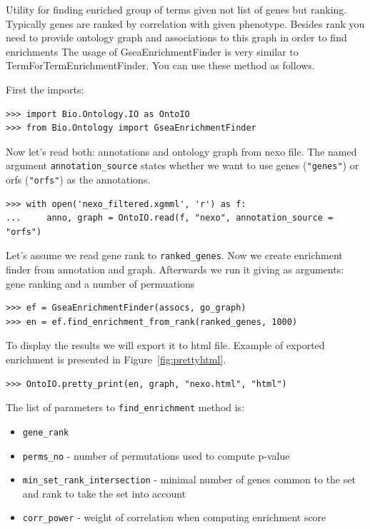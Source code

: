 \documentclass{report}
\begin{document}
Utility for finding enriched group of terms given not list of genes
but ranking. Typically genes are ranked by correlation with given
phenotype. Besides rank you need to provide ontology graph and
associations to this graph in order to find enrichments
The usage of GseaEnrichmentFinder is very similar to
TermForTermEnrichmentFinder. You can use these method as follows.

First the imports:
\begin{verbatim}
>>> import Bio.Ontology.IO as OntoIO
>>> from Bio.Ontology import GseaEnrichmentFinder
\end{verbatim}

Now let's read both: annotations and ontology graph from nexo file. The named
argument \verb|annotation_source| states whether we want to use genes (\verb|"genes"|)
or orfs (\verb|"orfs"|) as the annotations.

\begin{verbatim}
>>> with open('nexo_filtered.xgmml', 'r') as f:
...     anno, graph = OntoIO.read(f, "nexo", annotation_source = "orfs")
\end{verbatim}

Let's assume we read gene rank to \verb|ranked_genes|.
Now we create enrichment finder from annotation and graph. Afterwards we run it
giving as arguments: gene ranking and a number of permuations
\begin{verbatim}
>>> ef = GseaEnrichmentFinder(assocs, go_graph)
>>> en = ef.find_enrichment_from_rank(ranked_genes, 1000)
\end{verbatim}

To display the results we will export it to html file. Example of exported
enrichment is presented in Figure~\ref{fig:prettyhtml}.
\begin{verbatim}
>>> OntoIO.pretty_print(en, graph, "nexo.html", "html")
\end{verbatim}

The list of parameters to \verb|find_enrichment| method is:
\begin{itemize}
\item \verb|gene_rank|
\item \verb|perms_no| - number of permutations used to compute p-value
\item \verb|min_set_rank_intersection| - minimal number of genes common
to the set and rank to take the set into account
\item \verb|corr_power| - weight of correlation when computing
enrichment score
\end{itemize}
\end{document}
